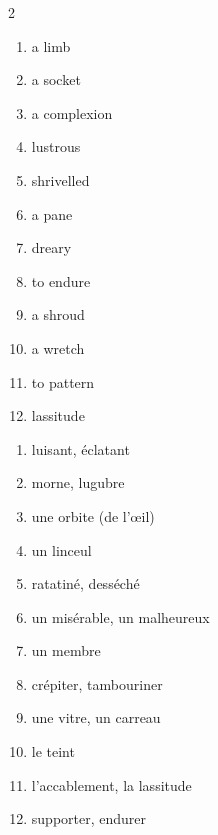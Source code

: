 \documentclass{fiche}
\begin{document}


\begin{multicols}{2}
\begin{enumerate}[label=\arabic*.,itemsep=1.2mm,leftmargin=*]
  \item a limb \hfill {}
  \item a socket \hfill {}
  \item a complexion \hfill {}
  \item lustrous \hfill {}
  \item shrivelled \hfill {}
  \item a pane \hfill {}
  \item dreary \hfill {}
  \item to endure \hfill {}
  \item a shroud \hfill {}
  \item a wretch \hfill {}
  \item to pattern \hfill {}
  \item lassitude \hfill {}
\end{enumerate}
\columnbreak
\begin{enumerate}[label=\alph*.,itemsep=1.2mm,leftmargin=*]
  \item luisant, éclatant
  \item morne, lugubre
  \item une orbite (de l'œil)
  \item un linceul
  \item ratatiné, desséché
  \item un misérable, un malheureux
  \item un membre
  \item crépiter, tambouriner
  \item une vitre, un carreau
  \item le teint
  \item l'accablement, la lassitude
  \item supporter, endurer
\end{enumerate}
\end{multicols}
\end{document}
